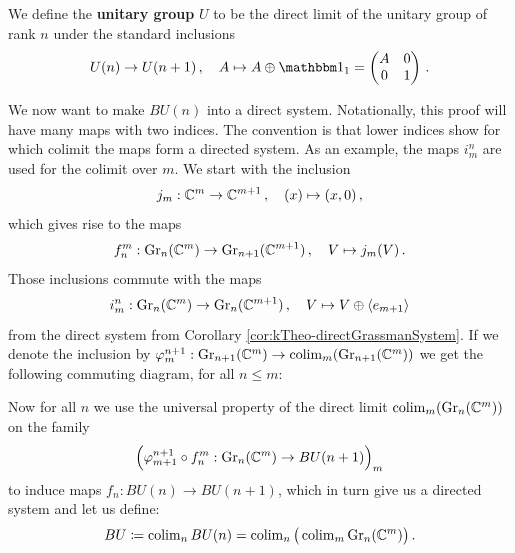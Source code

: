 \begin{definition}
	We define the \textbf{unitary group} $U$ to be the direct limit of the unitary group of rank $n$ under the standard inclusions
	\begin{equation*}
		U(n) \to U(n+1)\,,\quad A \mapsto A \oplus \Idm_1 =  \begin{pmatrix}
			A&0\\ 0&1
		\end{pmatrix}\,.
	\end{equation*} 
\end{definition}
\begin{definition}
	We now want to make $BU(n)$ into a direct system. Notationally, this proof will have many maps with two indices. The convention is that lower indices show for which colimit the maps form a directed system. As an example, the maps $i^n_m$ are used for the colimit over $m$. We start with the inclusion
	\begin{equation*}
		j_m: \mathbb{C}^m\to \mathbb{C}^{m+1}\,,\quad (x)\mapsto (x,0)\,,
	\end{equation*}which gives rise to the maps
	\begin{equation*}
		f_n^m:\operatorname{\mathrm{Gr}}_n(\mathbb{C}^m) \to \operatorname{\mathrm{Gr}}_{n+1}(\mathbb{C}^{m+1})\,,\quad V\mapsto j_m(V)\,.
	\end{equation*} Those inclusions commute with the maps 
	\begin{equation*}
	i_m^n:\operatorname{\mathrm{Gr}}_n(\mathbb{C}^m)\to \operatorname{\mathrm{Gr}}_n(\mathbb{C}^{m+1})\,,\quad V\mapsto V\oplus \langle e_{m+1} \rangle
	\end{equation*} from the direct system from Corollary \ref{cor:kTheo-directGrassmanSystem}. If we denote the inclusion by $\varphi_{m}^{n+1}:\operatorname{\mathrm{Gr}}_{n+1}(\mathbb{C}^m)\to \operatorname{\mathrm{colim}}_m(\operatorname{\mathrm{Gr}}_{n+1}(\mathbb{C}^m))$ we get the following commuting diagram, for all $n\leq m$:
	\begin{center}
	\end{center} 
	Now for all $n$ we use the universal property of the direct limit $\operatorname{\mathrm{colim}}_m(\operatorname{\mathrm{Gr}}_n(\mathbb{C}^m))$ on the family 
	\begin{equation*}
		\Big(
			\varphi^{n+1}_{m+1}\circ f^m_n: \operatorname{\mathrm{Gr}}_n(\mathbb{C}^m) \to BU(n+1)
		\Big)_m
	\end{equation*} to induce maps $f_n:BU(n)\to BU(n+1)$, which in turn give us a directed system and let us define:
	\begin{equation*}
		BU\coloneq \operatorname{\mathrm{colim}}_nBU(n)=\operatorname{\mathrm{colim}}_n\big(\operatorname{\mathrm{colim}}_m \operatorname{\mathrm{Gr}}_n(\mathbb{C}^m)\big)\,.
	\end{equation*} 
\end{definition}

